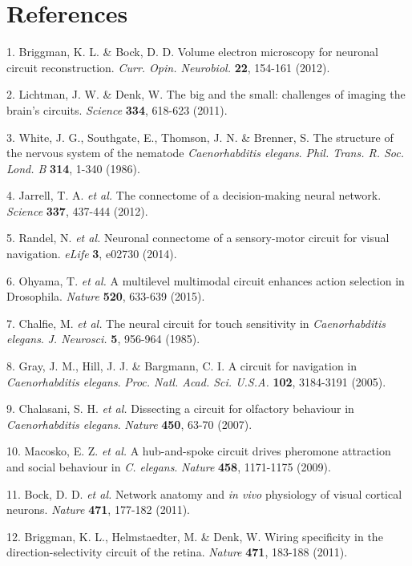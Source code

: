 \documentclass{article}
\begin{document}
\section*{References}
\begin{hangpars}

1. Briggman, K. L. \& Bock, D. D. Volume electron microscopy for neuronal circuit reconstruction. \textit{Curr. Opin. Neurobiol.} \textbf{22}, 154-161 (2012).

2. Lichtman, J. W. \& Denk, W. The big and the small: challenges of imaging the brain's circuits. \textit{Science} \textbf{334}, 618-623 (2011).

3. White, J. G., Southgate, E., Thomson, J. N. \& Brenner, S. The structure of the nervous system of the nematode \textit{Caenorhabditis elegans}. \textit{Phil. Trans. R. Soc. Lond. B} \textbf{314}, 1-340 (1986).

4. Jarrell, T. A.\textit{ et al.} The connectome of a decision-making neural network. \textit{Science} \textbf{337}, 437-444 (2012).

5. Randel, N.\textit{ et al.} Neuronal connectome of a sensory-motor circuit for visual navigation. \textit{eLife} \textbf{3}, e02730 (2014).

6. Ohyama, T.\textit{ et al.} A multilevel multimodal circuit enhances action selection in Drosophila. \textit{Nature} \textbf{520}, 633-639 (2015).

7. Chalfie, M.\textit{ et al.} The neural circuit for touch sensitivity in \textit{Caenorhabditis elegans}. \textit{J. Neurosci.} \textbf{5}, 956-964 (1985).

8. Gray, J. M., Hill, J. J. \& Bargmann, C. I. A circuit for navigation in \textit{Caenorhabditis elegans}. \textit{Proc. Natl. Acad. Sci. U.S.A.} \textbf{102}, 3184-3191 (2005).

9. Chalasani, S. H.\textit{ et al.} Dissecting a circuit for olfactory behaviour in \textit{Caenorhabditis elegans}. \textit{Nature} \textbf{450}, 63-70 (2007).

10. Macosko, E. Z.\textit{ et al.} A hub-and-spoke circuit drives pheromone attraction and social behaviour in \textit{C. elegans}. \textit{Nature} \textbf{458}, 1171-1175 (2009).

11. Bock, D. D.\textit{ et al.} Network anatomy and \textit{in vivo} physiology of visual cortical neurons. \textit{Nature} \textbf{471}, 177-182 (2011).

12. Briggman, K. L., Helmstaedter, M. \& Denk, W. Wiring specificity in the direction-selectivity circuit of the retina. \textit{Nature} \textbf{471}, 183-188 (2011).


\end{hangpars}
\end{document}
